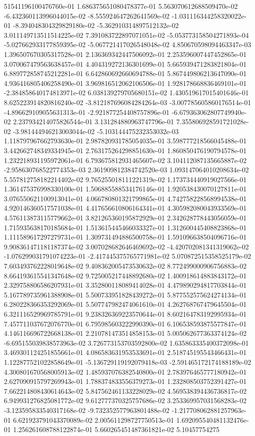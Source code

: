 51541196100476760e-01	1.686375651080478377e-01	5.563070612688509470e-02	-6.432360113996044015e-02	-8.555924647262641569e-02	-1.031116344258320022e-01	-8.394048304329829180e-02	-5.362910314897512132e-02	3.011149713511514225e-02	7.391083722897071051e-02	-5.053773158504271893e-04	-5.027662933177859395e-02	-5.067721417026548048e-02	4.850670598094463347e-03	1.396507670305317528e-01	2.136369342447506092e-01	2.253596007447452865e-01	3.070067479563638457e-01	4.404319272136301699e-01	5.665939471283821804e-01	6.889772858745212281e-01	6.642860692660694788e-01	5.867449806213647090e-01	4.936416805406258490e-01	3.969816512062106506e-01	1.928178668836469101e-01	-2.384858640174813971e-02	6.038139279705680151e-02	1.430519617015401646e-01	8.625223914820816240e-02	-3.812187696084284264e-03	-3.007785605860176514e-01	-4.896629109055631313e-01	-2.921877254408757896e-01	-6.679363062807749940e-02	2.237934214075826544e-01	3.131284880963747796e-01	7.355806928591721028e-02	-3.981444946213003044e-02	-5.103144475232353032e-03	1.118797967662793630e-01	2.987820931785054035e-01	3.598777218566045488e-01	3.442662748349334945e-01	2.763175264298851630e-01	1.860850476190794578e-01	1.232218931195972061e-01	6.793675812931465607e-02	3.104112087135665887e-02	-2.958630768522774353e-03	2.361909812384742520e-03	1.093147064010208634e-02	5.557812758182214402e-02	9.765255018111221319e-02	1.173734440919027566e-01	1.361475376998330100e-01	1.506885588534176146e-01	1.920538430070127811e-01	3.076550621100913041e-01	4.066780801321799865e-01	4.742758228568994538e-01	4.920146360517571038e-01	4.417656610806164341e-01	4.305982080043933569e-01	4.576113873115779662e-01	3.821265360195872929e-01	2.342628778443056059e-01	1.715935638170185684e-01	1.513615445466033327e-01	1.312600445408823868e-01	1.111589617297279731e-01	1.309731494886500758e-01	1.591096638504096716e-01	9.908361471181187374e-02	3.007028682646469692e-02	-4.420702081341319062e-02	-1.076299031791074223e-01	-2.417445375765771981e-02	5.070872515358525179e-02	7.603493762228019648e-02	9.408362005473530632e-02	8.772499000906756883e-02	8.664193615541347648e-02	9.725005217448892680e-02	1.400918614883843172e-01	2.329758806586207931e-01	3.352800118089414028e-01	4.479890294817703844e-01	5.167789735961388908e-01	5.500733951828439272e-01	5.877552575624274134e-01	6.280228366353292069e-01	5.507747982474061610e-01	4.262768767479645504e-01	6.321116529969785791e-01	9.238326369223570644e-01	8.602164783192995934e-01	7.457711037672076770e-01	6.795985603222990390e-01	6.106538593875577847e-01	4.146116696722668138e-01	2.210781473514858153e-01	5.005062677363374124e-02	-6.695155039838573963e-02	3.726773153703592800e-02	1.635863335400372098e-01	3.469301124251855661e-01	4.086583631953533691e-01	2.518745195543466431e-01	1.122877521022858649e-01	-5.136729119192079418e-03	-2.591465172174188189e-02	4.300801670568005913e-02	1.485937076382540800e-01	2.783976465777180942e-01	2.627090915797269943e-01	1.788374833556379273e-01	1.232808503752391427e-01	7.662214808430614643e-02	5.847562461133228029e-02	4.569538394436736817e-02	6.949931276825081772e-02	9.612777370325757686e-02	3.253369957031568283e-02	-3.123595833540317168e-02	-9.732352577963801488e-02	-1.217708062881257963e-01	6.621923791043370089e-02	2.005611298727750513e-01	1.692095540481132476e-01	1.256261608788122874e-01	5.660265451487361821e-02	5.10457754275